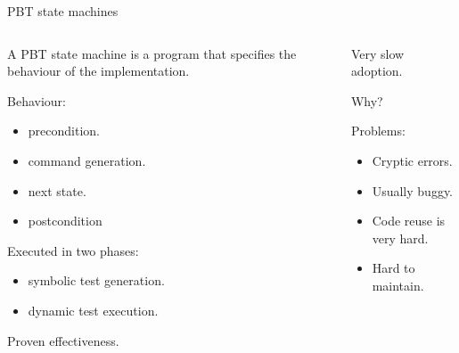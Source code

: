 \documentclass[aspectratio=169, 10pt]{beamer}
\begin{document}
\begin{frame}[label={sec:orgfe0f4a8}]{PBT state machines}
\begin{columns}
\begin{column}{0.48\columnwidth}
\onslide<+->
\onslide<+->
A PBT state machine is a program that specifies the behaviour of the implementation.
\onslide<+->
\vspace{10pt}

Behaviour:
\begin{itemize}
\item precondition.
\onslide<+->
\item command generation.
\onslide<+->
\item next state.
\onslide<+->
\item postcondition
\end{itemize}

\vspace{10pt}

\onslide<+->
Executed in two phases:
\onslide<+->
\begin{itemize}
\item symbolic test generation.
\onslide<+->
\item dynamic test execution.
\end{itemize}
\vspace{10pt}

\onslide<+->
Proven effectiveness.
\end{column}
\begin{column}{0.48\columnwidth}
\onslide<+->
Very slow adoption.
\vspace{10pt}

\onslide<+->
Why?
\vspace{10pt}

\onslide<+->
Problems:
\onslide<+->
\begin{itemize}
\item Cryptic errors.
\onslide<+->
\item Usually buggy.
\onslide<+->
\item Code reuse is very hard.
\onslide<+->
\item Hard to maintain.
\end{itemize}
\end{column}
\end{columns}
\end{frame}
\end{document}
